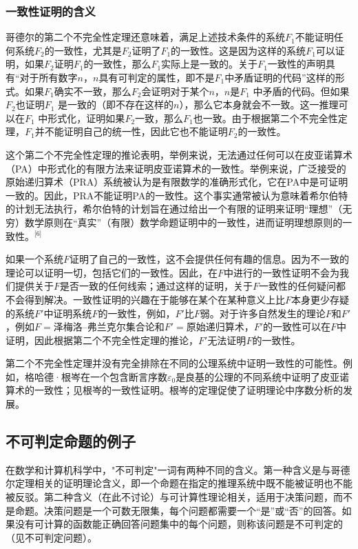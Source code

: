 \subsubsection{一致性证明的含义}  
哥德尔的第二个不完全性定理还意味着，满足上述技术条件的系统\( F_1 \)不能证明任何系统\( F_2 \)的一致性，尤其是\( F_2 \)证明了\( F_1 \)的一致性。这是因为这样的系统\( F_1 \)可以证明，如果\( F_2 \)证明\( F_1 \)的一致性，那么\( F_1 \)实际上是一致的。关于\( F_1 \)一致性的声明具有“对于所有数字\( n \)，\( n \)具有可判定的属性，即不是\( F_1 \)中矛盾证明的代码”这样的形式。如果\( F_1 \)确实不一致，那么\( F_2 \)会证明对于某个\( n \)，\( n \)是\( F_1 \) 中矛盾的代码。但如果\( F_2 \)也证明\( F_1 \) 是一致的（即不存在这样的\( n \)），那么它本身就会不一致。这一推理可以在\( F_1 \) 中形式化，证明如果\( F_2 \)一致，那么\( F_1 \)也一致。由于根据第二个不完全性定理，\( F_1 \)并不能证明自己的统一性，因此它也不能证明\( F_2 \)的一致性。

这个第二个不完全性定理的推论表明，举例来说，无法通过任何可以在皮亚诺算术（PA）中形式化的有限方法来证明皮亚诺算术的一致性。举例来说，广泛接受的原始递归算术（PRA）系统被认为是有限数学的准确形式化，它在PA中是可证明一致的。因此，PRA不能证明PA的一致性。这个事实通常被认为意味着希尔伯特的计划无法执行，希尔伯特的计划旨在通过给出一个有限的证明来证明“理想”（无穷）数学原则在“真实”（有限）数学命题证明中的一致性，进而证明理想原则的一致性。\(^\text{[6]}\)

如果一个系统\( F \)证明了自己的一致性，这不会提供任何有趣的信息。因为不一致的理论可以证明一切，包括它们的一致性。因此，在\( F \)中进行的一致性证明不会为我们提供关于\( F \)是否一致的任何线索；通过这样的证明，关于\( F \)一致性的任何疑问都不会得到解决。一致性证明的兴趣在于能够在某个在某种意义上比\( F \)本身更少存疑的系统\( F' \)中证明系统\( F \)的一致性，例如，\( F' \)比\( F \)弱。对于许多自然发生的理论\( F \)和\( F' \)，例如\( F = \)泽梅洛–弗兰克尔集合论和\( F' = \)原始递归算术，\( F' \)的一致性可以在\( F \)中证明，因此根据第二个不完全性定理的推论，\( F' \)无法证明\( F \)的一致性。

第二个不完全性定理并没有完全排除在不同的公理系统中证明一致性的可能性。例如，格哈德·根岑在一个包含断言序数\( \varepsilon_0 \)是良基的公理的不同系统中证明了皮亚诺算术的一致性；见根岑的一致性证明。根岑的定理促使了证明理论中序数分析的发展。
\subsection{不可判定命题的例子}  
在数学和计算机科学中，"不可判定"一词有两种不同的含义。第一种含义是与哥德尔定理相关的证明理论含义，即一个命题在指定的推理系统中既不能被证明也不能被反驳。第二种含义（在此不讨论）与可计算性理论相关，适用于决策问题，而不是命题。决策问题是一个可数无限集，每个问题都需要一个“是”或“否”的回答。如果没有可计算的函数能正确回答问题集中的每个问题，则称该问题是不可判定的（见不可判定问题）。

